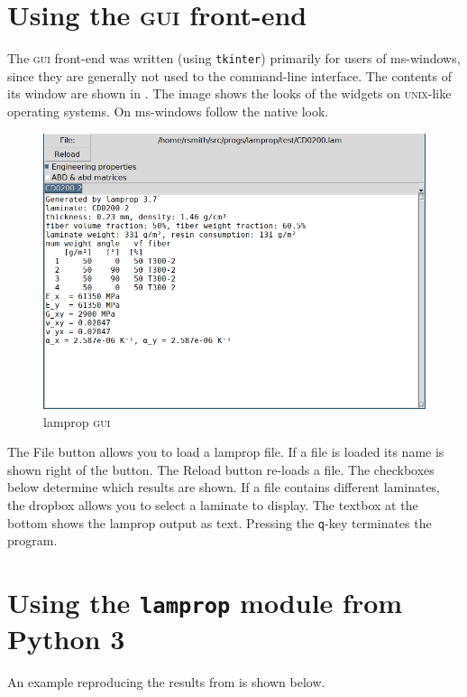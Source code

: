 \documentclass[a4paper,landscape,oneside,11pt,twocolumn]{memoir}
\begin{document}
\section{Using the \textsc{gui} front-end} %

The \textsc{gui} front-end was written (using \texttt{tkinter}) primarily for
users of ms-windows, since they are generally not used to the command-line
interface. The contents of its window are shown in . The
image shows the looks of the widgets on \textsc{unix}-like operating systems.
On ms-windows follow the native look.

\begin{figure}[!htbp]
  \centerline{\includegraphics[scale=1]{lamprop-gui.png}}
  \caption{\label{fig:lamprop-gui}lamprop \textsc{gui}}
\end{figure}

The \textsf{File} button allows you to load a lamprop file. If a file is
loaded its name is shown right of the button. The \textsf{Reload} button
re-loads a file. The checkboxes below determine which results are shown. If
a file contains different laminates, the dropbox allows you to select
a laminate to display. The textbox at the bottom shows the lamprop output as
text.
Pressing the \texttt{q}-key terminates the program.

\section{Using the \texttt{lamprop} module from Python 3} %

An example reproducing the results from  is shown
below.
\end{document}
